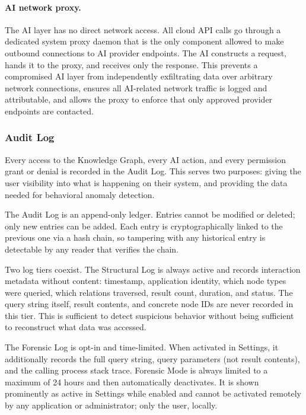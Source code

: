 \paragraph{AI network proxy.}
The AI layer has no direct network access. All cloud API calls go through a
dedicated system proxy daemon that is the only component allowed to make
outbound connections to AI provider endpoints. The AI constructs a request,
hands it to the proxy, and receives only the response. This prevents a
compromised AI layer from independently exfiltrating data over arbitrary
network connections, ensures all AI-related network traffic is logged and
attributable, and allows the proxy to enforce that only approved provider
endpoints are contacted.

\subsubsection{Audit Log}
\label{sec:audit-log}

Every access to the Knowledge Graph, every AI action, and every permission
grant or denial is recorded in the Audit Log. This serves two purposes:
giving the user visibility into what is happening on their system, and
providing the data needed for behavioral anomaly detection.

The Audit Log is an append-only ledger. Entries cannot be modified or deleted;
only new entries can be added. Each entry is cryptographically linked to the
previous one via a hash chain, so tampering with any historical entry is
detectable by any reader that verifies the chain.

Two log tiers coexist. The Structural Log is always active and records
interaction metadata without content: timestamp, application identity, which
node types were queried, which relations traversed, result count, duration,
and status. The query string itself, result contents, and concrete node IDs
are never recorded in this tier. This is sufficient to detect suspicious
behavior without being sufficient to reconstruct what data was accessed.

The Forensic Log is opt-in and time-limited. When activated in Settings, it
additionally records the full query string, query parameters (not result
contents), and the calling process stack trace. Forensic Mode is always
limited to a maximum of 24 hours and then automatically deactivates. It is
shown prominently as active in Settings while enabled and cannot be activated
remotely by any application or administrator; only the user, locally.

